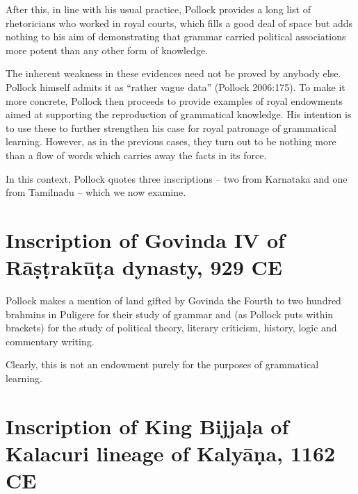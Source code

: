 \newpage

After this, in line with his usual practice, Pollock provides a long list of rhetoricians who worked in royal courts, which fills a good deal of space but adds nothing to his aim of demonstrating that grammar carried political associations more potent than any other form of knowledge.

The inherent weakness in these evidences need not be proved by anybody else. Pollock himself admits it as ``rather vague data'' (Pollock 2006:175). To make it more concrete, Pollock then proceeds to provide examples of royal endowments aimed at supporting the reproduction of grammatical knowledge. His intention is to use these to further strengthen his case for royal patronage of grammatical learning. However, as in the previous cases, they turn out to be nothing more than a flow of words which carries away the facts in its force.

In this context, Pollock quotes three inscriptions -- two from Karnataka and one from Tamilnadu -- which we now examine.

\section{Inscription of Govinda IV of Rāṣṭrakūṭa dynasty, 929 CE}\label{chap3-sec16}

Pollock makes a mention of land gifted by Govinda the Fourth to two hundred brahmins in Puligere for their study of grammar and (as Pollock puts within brackets) for the study of political theory, literary criticism, history, logic and commentary writing. 

Clearly, this is not an endowment purely for the purposes of grammatical learning.

\section{Inscription of King Bijjaḷa of Kalacuri lineage of Kalyāṇa, 1162 CE}\label{chap3-sec17}

